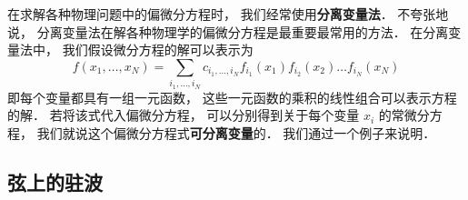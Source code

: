 
\begin{issues}
\issueDraft
\end{issues}

在求解各种物理问题中的偏微分方程时， 我们经常使用\textbf{分离变量法}． 不夸张地说， 分离变量法在解各种物理学的偏微分方程是最重要最常用的方法． 在分离变量法中， 我们假设微分方程的解可以表示为
\begin{equation}\label{SepVar_eq2}
f(x_1, \dots , x_N) = \sum_{i_1, \dots, i_N} c_{i_1, \dots, i_N} f_{i_1}(x_1) f_{i_2}(x_2) \dots f_{i_N}(x_N)
\end{equation}
即每个变量都具有一组一元函数， 这些一元函数的乘积的线性组合可以表示方程的解． 若将该式代入偏微分方程， 可以分别得到关于每个变量 $x_i$ 的常微分方程， 我们就说这个偏微分方程式\textbf{可分离变量}的． 我们通过一个例子来说明．









\subsection{弦上的驻波}


